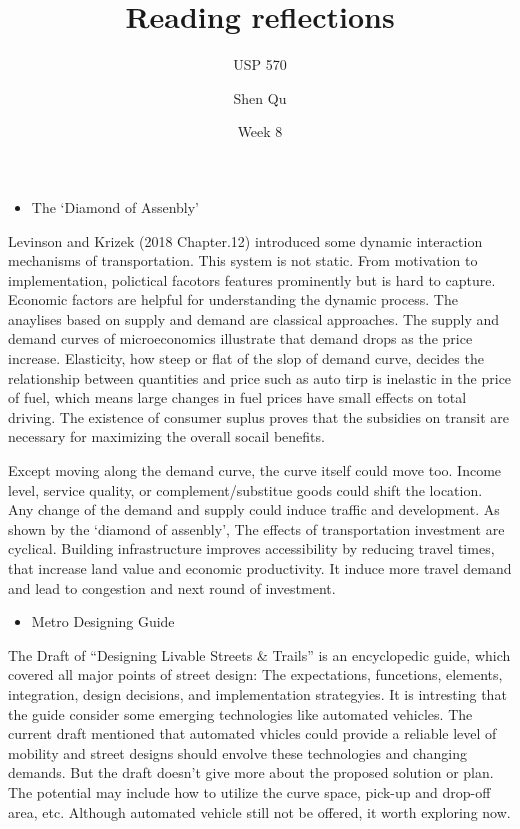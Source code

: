 \documentclass[12pt,]{article}
\title{Reading reflections}
\subtitle{USP 570}
\author{Shen Qu}
\date{Week 8}
\providecommand{\tightlist}{%
  \setlength{\itemsep}{0pt}\setlength{\parskip}{0pt}}
\begin{document}
\maketitle

\begin{itemize}
\tightlist
\item
  The `Diamond of Assenbly'
\end{itemize}

Levinson and Krizek (2018 Chapter.12) introduced some dynamic
interaction mechanisms of transportation. This system is not static.
From motivation to implementation, polictical facotors features
prominently but is hard to capture. Economic factors are helpful for
understanding the dynamic process. The anaylises based on supply and
demand are classical approaches. The supply and demand curves of
microeconomics illustrate that demand drops as the price increase.
Elasticity, how steep or flat of the slop of demand curve, decides the
relationship between quantities and price such as auto tirp is inelastic
in the price of fuel, which means large changes in fuel prices have
small effects on total driving. The existence of consumer suplus proves
that the subsidies on transit are necessary for maximizing the overall
socail benefits.

Except moving along the demand curve, the curve itself could move too.
Income level, service quality, or complement/substitue goods could shift
the location. Any change of the demand and supply could induce traffic
and development. As shown by the `diamond of assenbly', The effects of
transportation investment are cyclical. Building infrastructure improves
accessibility by reducing travel times, that increase land value and
economic productivity. It induce more travel demand and lead to
congestion and next round of investment.

\begin{itemize}
\tightlist
\item
  Metro Designing Guide
\end{itemize}

The Draft of ``Designing Livable Streets \& Trails'' is an encyclopedic
guide, which covered all major points of street design: The
expectations, funcetions, elements, integration, design decisions, and
implementation strategyies. It is intresting that the guide consider
some emerging technologies like automated vehicles. The current draft
mentioned that automated vhicles could provide a reliable level of
mobility and street designs should envolve these technologies and
changing demands. But the draft doesn't give more about the proposed
solution or plan. The potential may include how to utilize the curve
space, pick-up and drop-off area, etc. Although automated vehicle still
not be offered, it worth exploring now.
\end{document}
